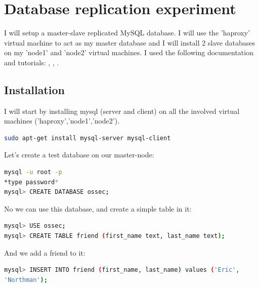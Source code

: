 \documentclass[12pt]{report}
\begin{document}
\section{Database replication experiment}
I will setup a master-slave replicated MySQL database. I will use the
'haproxy' virtual machine to act as my master database and I will
install 2 slave databases on my 'node1' and 'node2' virtual machines.
I used the following documentation and tutorials:
\cite{mysql_official_replication_doc}, \cite{mysql_replication_howtoforge}, \cite{mysql_replication_stackexchange}.

\subsection{Installation} 
I will start by installing mysql (server and client) on all the involved virtual
machines ('haproxy','node1','node2').
\begin{lstlisting}[language=bash]
sudo apt-get install mysql-server mysql-client
\end{lstlisting}

Let's create a test database on our master-node:
\begin{lstlisting}[language=bash]
mysql -u root -p
*type password*
mysql> CREATE DATABASE ossec;
\end{lstlisting}
No we can use this database, and create a simple table in it:
\begin{lstlisting}[language=bash]
mysql> USE ossec;
mysql> CREATE TABLE friend (first_name text, last_name text);
\end{lstlisting}
And we add a friend to it:
\begin{lstlisting}[language=bash]
mysql> INSERT INTO friend (first_name, last_name) values ('Eric',
'Northman');
\end{lstlisting}
\end{document}
